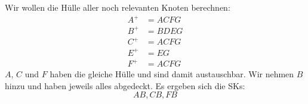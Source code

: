 \documentclass[a4paper, ngerman]{article}
\begin{document}
Wir wollen die Hülle aller noch relevanten Knoten berechnen:
\begin{align*}
    A^+ &= ACFG \\
    B^+ &= BDEG \\
    C^+ &= ACFG \\
    E^+ &= EG \\
    F^+ &= ACFG
\end{align*}
$A$, $C$ und $F$ haben die gleiche Hülle
und sind damit austauschbar.
Wir nehmen $B$ hinzu und haben
jeweils alles abgedeckt.
Es ergeben sich die SKs:
$$
    AB, CB, FB
$$
\end{document}
